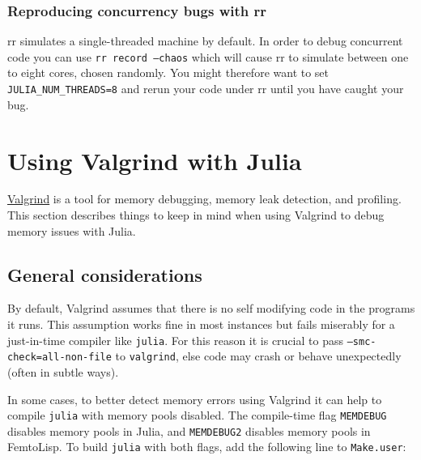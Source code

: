\hypertarget{8199500901675456324}{}


\subsubsection{Reproducing concurrency bugs with rr}



rr simulates a single-threaded machine by default. In order to debug concurrent code you can use \texttt{rr record --chaos} which will cause rr to simulate between one to eight cores, chosen randomly. You might therefore want to set \texttt{JULIA\_NUM\_THREADS=8} and rerun your code under rr until you have caught your bug.



\hypertarget{3182145831135367960}{}


\section{Using Valgrind with Julia}



\href{http://valgrind.org/}{Valgrind} is a tool for memory debugging, memory leak detection, and profiling.  This section describes things to keep in mind when using Valgrind to debug memory issues with Julia.



\hypertarget{527857279218691176}{}


\subsection{General considerations}



By default, Valgrind assumes that there is no self modifying code in the programs it runs.  This assumption works fine in most instances but fails miserably for a just-in-time compiler like \texttt{julia}.  For this reason it is crucial to pass \texttt{--smc-check=all-non-file} to \texttt{valgrind}, else code may crash or behave unexpectedly (often in subtle ways).



In some cases, to better detect memory errors using Valgrind it can help to compile \texttt{julia} with memory pools disabled.  The compile-time flag \texttt{MEMDEBUG} disables memory pools in Julia, and \texttt{MEMDEBUG2} disables memory pools in FemtoLisp.  To build \texttt{julia} with both flags, add the following line to \texttt{Make.user}:




